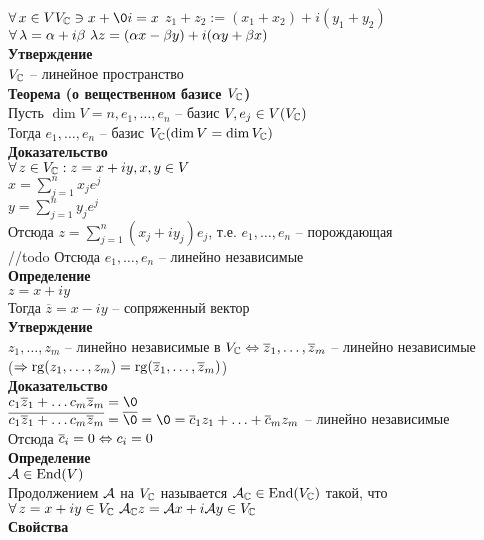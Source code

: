 \documentclass[12pt]{article}
\begin{document}
$\fall x \in V V_\Cset \ni x+\0i = x$
$z_1 + z_2 := (x_1+x_2)+i(y_1+y_2)$\\
$\forall\, \lambda = \alpha + i\beta\ \lambda z = (\alpha x - \beta y) + i (\alpha y + \beta x)$\\
\textbf{Утверждение}\\
$V_\mathbb{C}$ -- линейное пространство\\
\textbf{Теорема (о вещественном базисе $V_\mathbb{C}$)}\\
Пусть $\dim V = n, e_1, \ldots, e_n$ -- базис $V, e_j \in V(V_\mathbb{C})$\\
Тогда $e_1, \ldots, e_n$ -- базис $V_\mathbb{C} (\dim V = \dim V_\mathbb{C})$\\
\textbf{Доказательство}\\
$\forall\, z \in V_\mathbb{C}: z = x+iy, x,y \in V$\\
$x = \sum_{j=1}^n x_je^j$\\
$y = \sum_{j=1}^n y_je^j$\\
Отсюда $z = \sum_{j=1}^n(x_j + iy_j) e_j$, т.е. $e_1, \ldots, e_n$ -- порождающая\\
//todo
Отсюда $e_1, \ldots, e_n$ -- линейно независимые\\
\textbf{Определение}\\
$z=x+iy$\\
Тогда $\overline z = x-iy$ -- сопряженный вектор\\
\textbf{Утверждение}\\
$z_1, \ldots, z_m$ -- линейно независимые в $V_\mathbb{C} \Leftrightarrow \overline z_1, \ldots, \overline z_m$ -- линейно независимые\\
($\Rightarrow \operatorname{rg} (z_1, \ldots, z_m) = \operatorname{rg} (\overline z_1, \ldots, \overline z_m)$)\\
\textbf{Доказательство}\\
$c_1 \ol z_1 + \ldots c_m \ol z_m = \0$\\
$\ol{c_1 \ol z_1 + \ldots c_m \ol z_m} = \ol \0 = \0 = \ol c_1 z_1 + \ldots + \ol c_m z_m$ -- линейно независимые\\
Отсюда $\overline c_i = 0 \Leftrightarrow c_i = 0$\\
\textbf{Определение}\\
$\mathcal{A} \in \operatorname{End}(V)$\\
Продолжением $\mathcal{A}$ на $V_\mathbb{C}$ называется $\mathcal{A}_\mathbb{C} \in \operatorname{End}(V_\mathbb{C})$ такой, что\\
$\forall\, z=x+iy\in V_\mathbb{C}\ \mathcal{A}_\mathbb{C} z = \mathcal{A} x + i\mathcal{A} y \in V_\mathbb{C}$\\
\textbf{Свойства}
\end{document}
